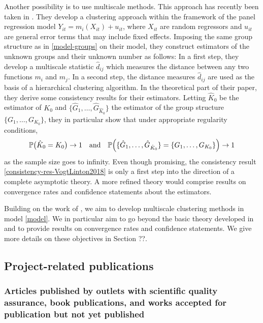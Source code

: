 \documentclass[a4paper,12pt]{article}
\begin{document}
\begin{itemize}[label=--,leftmargin=0.5cm]
Another possibility is to use multiscale methods. This approach has recently been taken in \cite{VogtLinton2018}. They develop a clustering approach within the framework of the panel regression model $Y_{it} = m_i(X_{it}) + u_{it}$, where $X_{it}$ are random regressors and $u_{it}$ are general error terms that may include fixed effects. Imposing the same group structure as in \eqref{model-groups} on their  model, they construct estimators of the unknown groups and their unknown number as follows: In a first step, they develop a multiscale statistic $\hat{d}_{ij}$ which measures the distance between any two functions $m_i$ and $m_j$. In a second step, the distance measures $\hat{d}_{ij}$ are used as the basis of a hierarchical clustering algorithm. In the theoretical part of their paper, they derive some consistency results for their estimators. Letting $\hat{K}_0$ be the estimator of $K_0$ and $\{ \hat{G}_1,\ldots,\hat{G}_{\hat{K}_0} \}$ the estimator of the group structure $\{ G_1,\ldots,G_{K_0} \}$, they in particular show that under appropriate regularity conditions, 
\begin{equation}\label{consistency-res-VogtLinton2018}
\mathbb{P} \big( \hat{K}_0 = K_0 \big) \rightarrow 1 \quad \text{and} \quad \mathbb{P} \Big( \{ \hat{G}_1,\ldots,\hat{G}_{\hat{K}_0} \} = \{ G_1,\ldots,G_{K_0} \} \Big) \rightarrow 1 
\end{equation}
as the sample size goes to infinity. %
Even though promising, the consistency result \eqref{consistency-res-VogtLinton2018} is only a first step into the direction of a complete asymptotic theory. A more refined theory would comprise results on convergence rates and confidence statements about the estimators. 


Building on the work of \cite{VogtLinton2018}, we aim to develop multiscale clustering methods in model \eqref{model}. We in particular aim to go beyond the basic theory developed in \cite{VogtLinton2018} and to provide results on convergence rates and confidence statements. We give more details on these objectives in Section ??.  


\subsection{Project-related publications}


\subsubsection{Articles published by outlets with scientific quality assurance, book publications, and works accepted for publication but not yet published}


\end{itemize}
\end{document}
